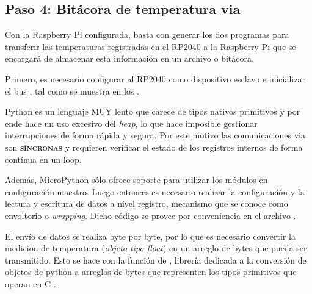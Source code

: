 %
%



\subsection{Paso 4: Bitácora de temperatura via \IIC}%
\label{sec:step4}

Con la Raspberry Pi configurada, basta con generar los dos programas para transferir las temperaturas registradas en el RP2040 a la Raspberry Pi que se encargará de almacenar esta información en un archivo o bitácora.

Primero, es necesario configurar al RP2040 como dispositivo esclavo e inicializar el bus \IIC, tal como se muestra en los .

Python es un lenguaje MUY lento que carece de tipos nativos primitivos y por ende hace un uso excesivo del \emph{heap}, lo que hace imposible gestionar interrupciones de forma rápida y segura.
Por este motivo las comunicaciones via \IIC son \textbf{\textsc{síncronas}} y requieren verificar el estado de los registros internos de forma contínua en un loop.

Además, MicroPython sólo ofrece soporte para utilizar los módulos \IIC en configuración maestro.
Luego entonces es necesario realizar la configuración y la lectura y escritura de datos a nivel registro, mecanismo que se conoce como envoltorio o \emph{wrapping}.
Dicho código se provee por conveniencia en el archivo .





El envío de datos se realiza byte por byte, por lo que es necesario convertir la medición de temperatura (\emph{objeto tipo float}) en un arreglo de bytes que pueda ser transmitido.
Esto se hace con la función  de , librería dedicada a la conversión de objetos de python a arreglos de bytes que representen los tipos primitivos que operan en C .

